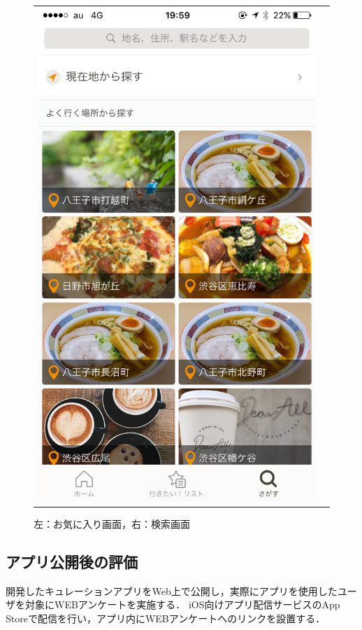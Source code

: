 \documentclass[a4paper]{jsarticle}
\begin{document}
\begin{enumerate}
\begin{enumerate}
\begin{figure}[H]
\begin{center}
\begin{tabular}{cc}
\begin{minipage}{0.35\hsize}
      \includegraphics[width=\hsize]{./images/curation_search.png}
    \end{minipage}
  \end{tabular}
    \caption{左：お気に入り画面，右：検索画面}
    \label{fig:curation_screen_structure_02}
  \end{center}
\end{figure}
\fi


\subsection{アプリ公開後の評価}
開発したキュレーションアプリをWeb上で公開し，実際にアプリを使用したユーザを対象にWEBアンケートを実施する．
iOS向けアプリ配信サービスのApp Storeで配信を行い，アプリ内にWEBアンケートへのリンクを設置する．


\end{enumerate}
\end{enumerate}
\end{document}
